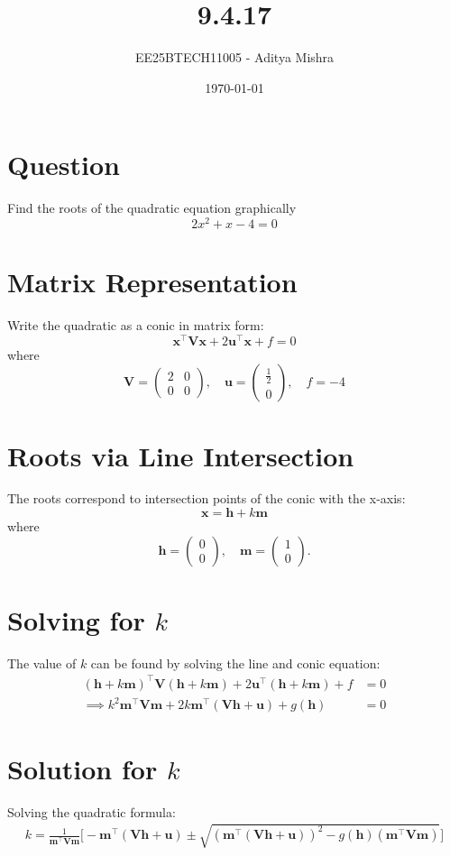\documentclass[12pt]{article}
\title{9.4.17}
\author{EE25BTECH11005 - Aditya Mishra}
\date{\today}
\newcommand{\myvec}[1]{\begin{pmatrix}#1\end{pmatrix}}
\let\vec\mathbf
\begin{document}
\maketitle

\section*{Question}
Find the roots of the quadratic equation graphically
\[
2x^2 + x - 4 = 0
\]

\section*{Matrix Representation}
Write the quadratic as a conic in matrix form:
\[
\vec{x}^{\top} \vec{V} \vec{x} + 2 \vec{u}^{\top} \vec{x} + f = 0
\]
where
\[
\vec{V} = \myvec{2 & 0 \\ 0 & 0}, \quad
\vec{u} = \myvec{\frac{1}{2} \\ 0}, \quad
f = -4
\]

\section*{Roots via Line Intersection}
The roots correspond to intersection points of the conic with the x-axis:
\[
\vec{x} = \vec{h} + k \vec{m}
\]
where
\[
\vec{h} = \myvec{0 \\ 0}, \quad \vec{m} = \myvec{1 \\ 0}.
\]

\section*{Solving for \(k\)}
The value of $k$ can be found by solving the line and conic equation:
\begin{align}
(\vec{h} + k \vec{m})^{\top} \vec{V} (\vec{h} + k \vec{m}) + 2\vec{u}^{\top} (\vec{h} + k \vec{m}) + f &= 0 \\
\implies k^{2} \vec{m}^{\top}\vec{V}\vec{m} + 2k \vec{m}^{\top} (\vec{V}\vec{h} + \vec{u}) + g(\vec{h}) &= 0
\end{align}

\section*{Solution for \(k\)}
Solving the quadratic formula:
\begin{align}
k = \frac{1}{\vec{m}^{\top}\vec{V}\vec{m}}
\Bigg[
    -\vec{m}^{\top} (\vec{V}\vec{h} + \vec{u})
    \pm
    \sqrt{ (\vec{m}^{\top}(\vec{V}\vec{h} + \vec{u}))^2 - g(\vec{h}) (\vec{m}^{\top}\vec{V}\vec{m}) }
\Bigg]
\end{align}
\end{document}
